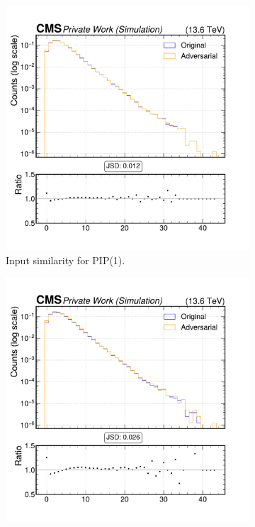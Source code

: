 \begin{figure}[h]
  \centering
  \begin{subfigure}[t]{0.32\textwidth}
    \includegraphics[width=\linewidth]{media/output/features/compare/intprob_1/cmp_global_features_n_Npfcand.pdf}
    \caption{Input similarity for PIP(1).}
  \end{subfigure}\hfill
  \begin{subfigure}[t]{0.32\textwidth}
    \includegraphics[width=\linewidth]{media/output/features/compare/intprob_2/cmp_global_features_n_Npfcand.pdf}

\end{subfigure}
\end{figure}
